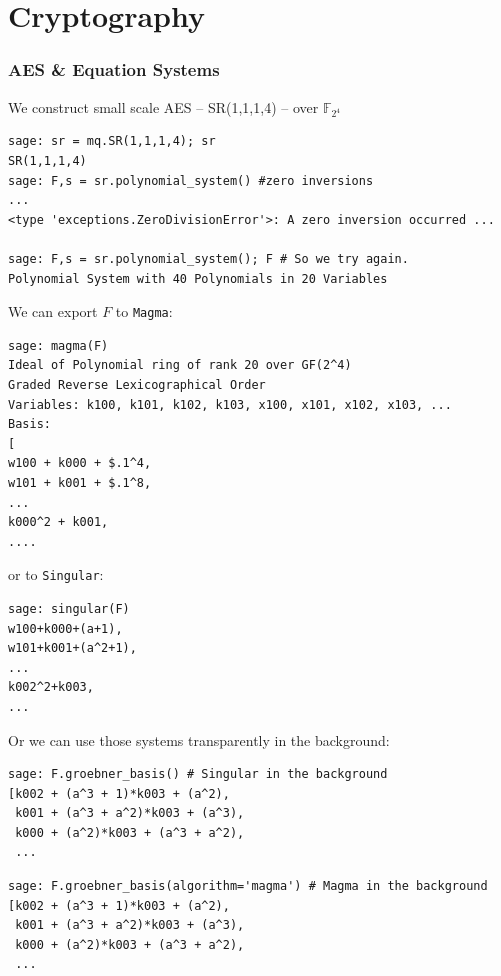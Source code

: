 \documentclass[10pt]{beamer}
\newcommand{\field}[1]{\mathbb{#1}}
\newcommand{\F}{\field{F}}
\begin{document}
\section{Cryptography}

\begin{frame}
\frametitle{AES \& Equation Systems}

We construct small scale AES -- SR(1,1,1,4) -- over $\F_{2^4}$

\begin{lstlisting}
sage: sr = mq.SR(1,1,1,4); sr
SR(1,1,1,4)
sage: F,s = sr.polynomial_system() #zero inversions
...
<type 'exceptions.ZeroDivisionError'>: A zero inversion occurred ...

sage: F,s = sr.polynomial_system(); F # So we try again.
Polynomial System with 40 Polynomials in 20 Variables
\end{lstlisting}

\framebreak

We can export $F$ to {\tt Magma}:

\begin{lstlisting}
sage: magma(F)
Ideal of Polynomial ring of rank 20 over GF(2^4)
Graded Reverse Lexicographical Order
Variables: k100, k101, k102, k103, x100, x101, x102, x103, ...
Basis:
[
w100 + k000 + $.1^4,
w101 + k001 + $.1^8,
...
k000^2 + k001,
....
\end{lstlisting}

or to {\tt Singular}:

\begin{lstlisting}
sage: singular(F)
w100+k000+(a+1),
w101+k001+(a^2+1),
...
k002^2+k003,
...
\end{lstlisting}

\framebreak

Or we can use those systems transparently in the background:

\begin{lstlisting}
sage: F.groebner_basis() # Singular in the background
[k002 + (a^3 + 1)*k003 + (a^2),
 k001 + (a^3 + a^2)*k003 + (a^3),
 k000 + (a^2)*k003 + (a^3 + a^2),
 ...
\end{lstlisting}

\begin{lstlisting}
sage: F.groebner_basis(algorithm='magma') # Magma in the background
[k002 + (a^3 + 1)*k003 + (a^2),
 k001 + (a^3 + a^2)*k003 + (a^3),
 k000 + (a^2)*k003 + (a^3 + a^2),
 ...
\end{lstlisting}

\framebreak


\end{frame}
\end{document}
